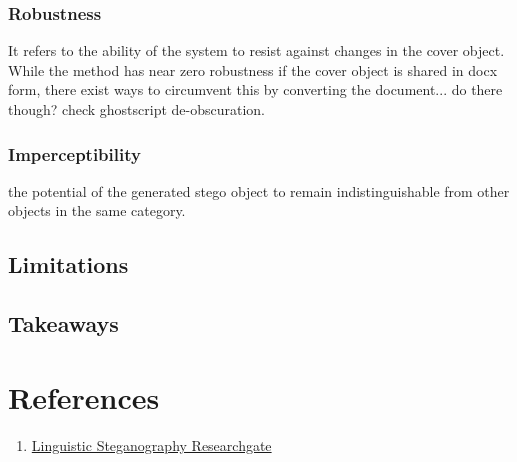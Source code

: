 \documentclass{article}
\begin{document}
\subsubsection{Robustness}
It refers to the ability of the system to resist against changes in the cover object. While the method has near zero robustness if the cover object is shared in docx form, there exist ways to circumvent this by converting the document... do there though? check ghostscript de-obscuration.
\subsubsection{Imperceptibility}
the potential of the generated stego object to remain indistinguishable from other objects in the same category.
\subsection{Limitations}
\subsection{Takeaways}
\section{References}
\begin{enumerate}
\item \href{https://www.researchgate.net/publication/267767675_Syntactic_Bank-based_Linguistic_Steganography_Approach}{Linguistic Steganography Researchgate}
\end{enumerate}
\end{document}
